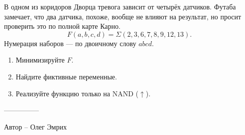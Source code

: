 \question
В одном из коридоров Дворца тревога зависит от четырёх датчиков. Футаба замечает, что два датчика, похоже, вообще не влияют на результат, но просит проверить это по полной карте Карно.
\[
F(a,b,c,d)=\Sigma(2,3,6,7,8,9,12,13).
\]
Нумерация наборов --- по двоичному слову $abcd$.
\begin{enumerate}
\item Минимизируйте $F$.
\item Найдите фиктивные переменные.
\item Реализуйте функцию только на NAND ($\uparrow$).
\end{enumerate}

---------------

Автор -- Олег Эмрих
